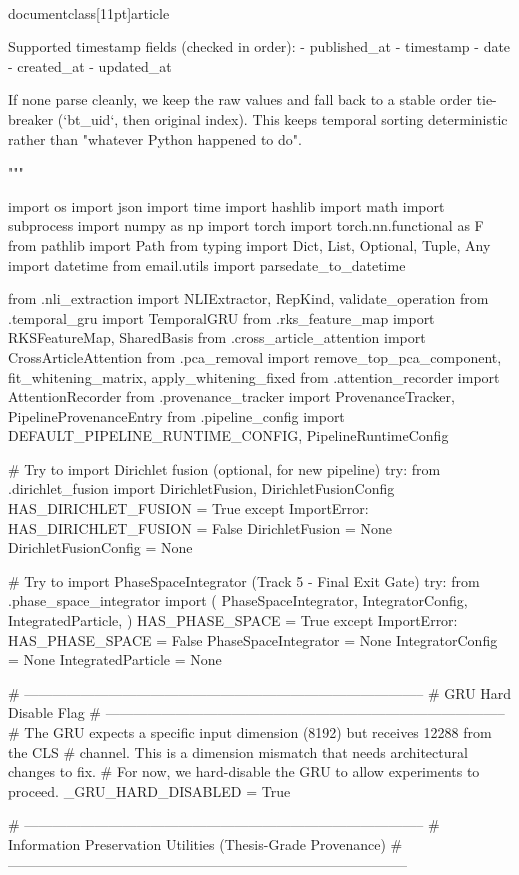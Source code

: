 \\documentclass[11pt]{article}
\begin{document}
\begin{CodeBlock}
Supported timestamp fields (checked in order):
  - published_at
  - timestamp
  - date
  - created_at
  - updated_at

If none parse cleanly, we keep the raw values and fall back to a stable order tie-breaker (`bt_uid`, then
original index). This keeps temporal sorting deterministic rather than "whatever Python happened to do".

"""

import os
import json
import time
import hashlib
import math
import subprocess
import numpy as np
import torch
import torch.nn.functional as F
from pathlib import Path
from typing import Dict, List, Optional, Tuple, Any
import datetime
from email.utils import parsedate_to_datetime

from .nli_extraction import NLIExtractor, RepKind, validate_operation
from .temporal_gru import TemporalGRU
from .rks_feature_map import RKSFeatureMap, SharedBasis
from .cross_article_attention import CrossArticleAttention
from .pca_removal import remove_top_pca_component, fit_whitening_matrix, apply_whitening_fixed
from .attention_recorder import AttentionRecorder
from .provenance_tracker import ProvenanceTracker, PipelineProvenanceEntry
from .pipeline_config import DEFAULT_PIPELINE_RUNTIME_CONFIG, PipelineRuntimeConfig

# Try to import Dirichlet fusion (optional, for new pipeline)
try:
    from .dirichlet_fusion import DirichletFusion, DirichletFusionConfig
    HAS_DIRICHLET_FUSION = True
except ImportError:
    HAS_DIRICHLET_FUSION = False
    DirichletFusion = None
    DirichletFusionConfig = None

# Try to import PhaseSpaceIntegrator (Track 5 - Final Exit Gate)
try:
    from .phase_space_integrator import (
        PhaseSpaceIntegrator,
        IntegratorConfig,
        IntegratedParticle,
    )
    HAS_PHASE_SPACE = True
except ImportError:
    HAS_PHASE_SPACE = False
    PhaseSpaceIntegrator = None
    IntegratorConfig = None
    IntegratedParticle = None

# --------------------------------------------------------------------------------------
# GRU Hard Disable Flag
# --------------------------------------------------------------------------------------
# The GRU expects a specific input dimension (8192) but receives 12288 from the CLS
# channel. This is a dimension mismatch that needs architectural changes to fix.
# For now, we hard-disable the GRU to allow experiments to proceed.
_GRU_HARD_DISABLED = True


# --------------------------------------------------------------------------------------
# Information Preservation Utilities (Thesis-Grade Provenance)
# --------------------------------------------------------------------------------------


\end{CodeBlock}
\end{document}

